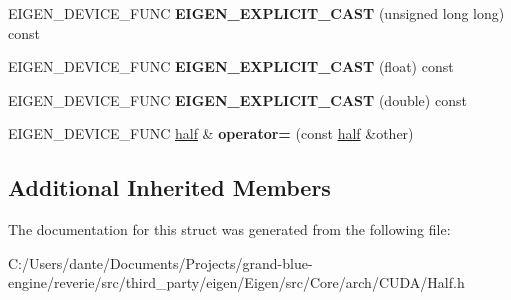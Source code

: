 \begin{DoxyCompactItemize}
E\+I\+G\+E\+N\+\_\+\+D\+E\+V\+I\+C\+E\+\_\+\+F\+U\+NC {\bfseries E\+I\+G\+E\+N\+\_\+\+E\+X\+P\+L\+I\+C\+I\+T\+\_\+\+C\+A\+ST} (unsigned long long) const
\item 
\mbox{\label{struct_eigen_1_1half_a36b0fe8c6af9c353b1c4c9578cd24227}} 
E\+I\+G\+E\+N\+\_\+\+D\+E\+V\+I\+C\+E\+\_\+\+F\+U\+NC {\bfseries E\+I\+G\+E\+N\+\_\+\+E\+X\+P\+L\+I\+C\+I\+T\+\_\+\+C\+A\+ST} (float) const
\item 
\mbox{\label{struct_eigen_1_1half_adec8bfdfe430518626453a17e1d90ca2}} 
E\+I\+G\+E\+N\+\_\+\+D\+E\+V\+I\+C\+E\+\_\+\+F\+U\+NC {\bfseries E\+I\+G\+E\+N\+\_\+\+E\+X\+P\+L\+I\+C\+I\+T\+\_\+\+C\+A\+ST} (double) const
\item 
\mbox{\label{struct_eigen_1_1half_a1bdc641b2ae9ee7cd8289b116a7c96b3}} 
E\+I\+G\+E\+N\+\_\+\+D\+E\+V\+I\+C\+E\+\_\+\+F\+U\+NC \mbox{\hyperlink{struct_eigen_1_1half}{half}} \& {\bfseries operator=} (const \mbox{\hyperlink{struct_eigen_1_1half}{half}} \&other)
\end{DoxyCompactItemize}
\subsection*{Additional Inherited Members}


The documentation for this struct was generated from the following file\+:\begin{DoxyCompactItemize}
\item 
C\+:/\+Users/dante/\+Documents/\+Projects/grand-\/blue-\/engine/reverie/src/third\+\_\+party/eigen/\+Eigen/src/\+Core/arch/\+C\+U\+D\+A/Half.\+h\end{DoxyCompactItemize}
